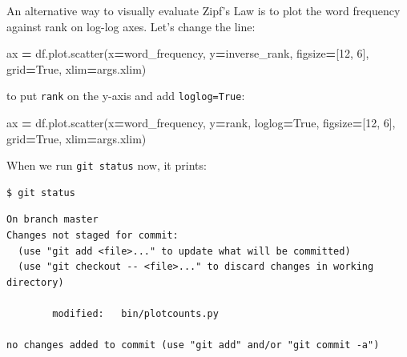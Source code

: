 \documentclass[
]{krantz}
\makeatletter
\newenvironment{Shaded}{\begin{snugshade}}{\end{snugshade}}
\newcommand{\DecValTok}[1]{\textcolor[rgb]{0.00,0.00,0.81}{#1}}
\newcommand{\NormalTok}[1]{#1}
\newcommand{\OperatorTok}[1]{\textcolor[rgb]{0.81,0.36,0.00}{\textbf{#1}}}
\newcommand{\StringTok}[1]{\textcolor[rgb]{0.31,0.60,0.02}{#1}}
\newcommand{\VariableTok}[1]{\textcolor[rgb]{0.00,0.00,0.00}{#1}}
\newenvironment{kframe}{%
\medskip{}
\setlength{\fboxsep}{.8em}
 \def\at@end@of@kframe{}%
 \ifinner\ifhmode%
  \def\at@end@of@kframe{\end{minipage}}%
  \begin{minipage}{\columnwidth}%
 \fi\fi%
 \def\FrameCommand##1{\hskip\@totalleftmargin \hskip-\fboxsep
 \colorbox{shadecolor}{##1}\hskip-\fboxsep
     \hskip-\linewidth \hskip-\@totalleftmargin \hskip\columnwidth}%
 \MakeFramed {\advance\hsize-\width
   \@totalleftmargin\z@ \linewidth\hsize
   \@setminipage}}%
 {\par\unskip\endMakeFramed%
 \at@end@of@kframe}
\renewenvironment{Shaded}{\begin{kframe}}{\end{kframe}}
\makeatother
\begin{document}
An alternative way to visually evaluate Zipf's Law is
to plot the word frequency against rank on log-log axes.
Let's change the line:

\begin{Shaded}
\begin{Highlighting}[]
\NormalTok{    ax }\OperatorTok{=}\NormalTok{ df.plot.scatter(x}\OperatorTok{=}\StringTok{\textquotesingle{}word\_frequency\textquotesingle{}}\NormalTok{, y}\OperatorTok{=}\StringTok{\textquotesingle{}inverse\_rank\textquotesingle{}}\NormalTok{,}
\NormalTok{                         figsize}\OperatorTok{=}\NormalTok{[}\DecValTok{12}\NormalTok{, }\DecValTok{6}\NormalTok{], grid}\OperatorTok{=}\VariableTok{True}\NormalTok{, xlim}\OperatorTok{=}\NormalTok{args.xlim)}
\end{Highlighting}
\end{Shaded}

to put \texttt{\textquotesingle{}rank\textquotesingle{}} on the y-axis and add \texttt{loglog=True}:

\begin{Shaded}
\begin{Highlighting}[]
\NormalTok{    ax }\OperatorTok{=}\NormalTok{ df.plot.scatter(x}\OperatorTok{=}\StringTok{\textquotesingle{}word\_frequency\textquotesingle{}}\NormalTok{, y}\OperatorTok{=}\StringTok{\textquotesingle{}rank\textquotesingle{}}\NormalTok{, loglog}\OperatorTok{=}\VariableTok{True}\NormalTok{,}
\NormalTok{                         figsize}\OperatorTok{=}\NormalTok{[}\DecValTok{12}\NormalTok{, }\DecValTok{6}\NormalTok{], grid}\OperatorTok{=}\VariableTok{True}\NormalTok{, xlim}\OperatorTok{=}\NormalTok{args.xlim)}
\end{Highlighting}
\end{Shaded}

When we run \texttt{git\ status} now,
it prints:

\begin{verbatim}
$ git status
\end{verbatim}

\begin{verbatim}
On branch master
Changes not staged for commit:
  (use "git add <file>..." to update what will be committed)
  (use "git checkout -- <file>..." to discard changes in working directory)

        modified:   bin/plotcounts.py

no changes added to commit (use "git add" and/or "git commit -a")
\end{verbatim}
\end{document}
